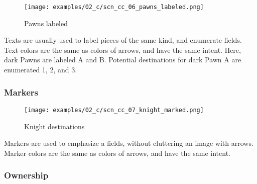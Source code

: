 \vspace*{-0.7\baselineskip}
\noindent
\begin{wrapfigure}[9]{l}{0.4\textwidth}
\centering
\texttt{[image: examples/02\_c/scn\_cc\_06\_pawns\_labeled.png]}
\vspace*{-1.4\baselineskip}
\caption{Pawns labeled}
\label{fig:scn_cc_06_pawns_labeled}
\end{wrapfigure}
Texts are usually used to label pieces of the same kind, and enumerate fields.
Text colors are the same as colors of arrows, and have the same intent. \newline
\indent
Here, dark Pawns are labeled A and B. Potential destinations for dark Pawn A are
enumerated 1, 2, and 3.

\clearpage %

\subsubsection*{Markers}
\label{sec:Classical Chess/Chessboard/Examples/Markers}

\vspace*{-0.7\baselineskip}
\noindent
\begin{wrapfigure}[6]{l}{0.4\textwidth}
\centering
\texttt{[image: examples/02\_c/scn\_cc\_07\_knight\_marked.png]}
\vspace*{-1.4\baselineskip}
\caption{Knight destinations}
\label{fig:scn_cc_07_knight_marked}
\end{wrapfigure}
Markers are used to emphasize a fields, without cluttering an image with arrows. \newline
\indent
Marker colors are the same as colors of arrows, and have the same intent.

\vspace*{4.7\baselineskip}
\subsubsection*{Ownership}
\label{sec:Classical Chess/Chessboard/Examples/Ownership}

